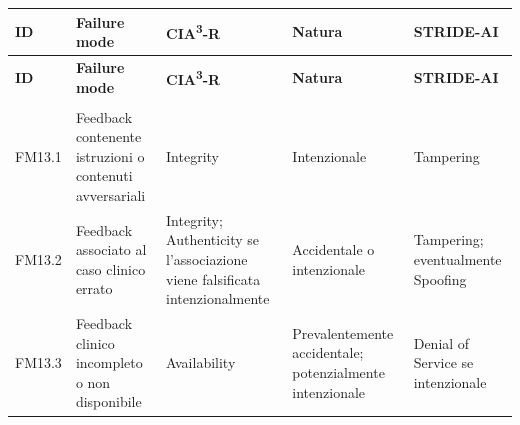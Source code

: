 {
\small
{}
\setlength{\tabcolsep}{4pt}
\renewcommand{\arraystretch}{1.08}

\begin{xltabular}{\textwidth}{
    >{\raggedright\arraybackslash}p{1.35cm}
    X
    >{\raggedright\arraybackslash}p{3.5cm}
    >{\raggedright\arraybackslash}p{2.7cm}
    >{\raggedright\arraybackslash}p{2.4cm}
}

\toprule

\textbf{ID} &
\textbf{Failure mode} &
\textbf{CIA\textsuperscript{3}-R} &
\textbf{Natura} &
\textbf{STRIDE-AI} \\

\midrule

\endfirsthead

\toprule

\textbf{ID} &
\textbf{Failure mode} &
\textbf{CIA\textsuperscript{3}-R} &
\textbf{Natura} &
\textbf{STRIDE-AI} \\

\midrule

\endhead

 \\
\endfoot

\endlastfoot


FM13.1 &

Feedback contenente istruzioni o contenuti avversariali &

Integrity &

Intenzionale &

Tampering \\

\midrule


FM13.2 &

Feedback associato al caso clinico errato &

Integrity; Authenticity se l'associazione viene falsificata intenzionalmente &

Accidentale o intenzionale &

Tampering; eventualmente Spoofing \\

\midrule


FM13.3 &

Feedback clinico incompleto o non disponibile &

Availability &

Prevalentemente accidentale; potenzialmente intenzionale &

Denial of Service se intenzionale \\


\end{xltabular}}

